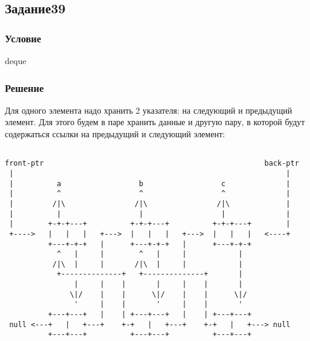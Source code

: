 \documentclass[10pt,a4paper]{article}
\begin{document}
\subsection*{Задание39}
\subsubsection*{Условие}
deque
\subsubsection*{Решение}
Для одного элемента надо хранить 2 указателя: на следующий и
предыдущий элемент. Для этого будем в паре хранить данные и другую
пару, в которой будут содержаться ссылки на предыдущий и следующий
элемент:
\begin{lstlisting}

front-ptr                                                   back-ptr
 |                                                               |
 |          a                  b                  c              |
 |          ^                  ^                  ^              |
 |         /|\                /|\                /|\             |
 |          |                  |                  |              |
 |        +-+-+---+          +-+-+---+          +-+-+---+        |
 +---->   |   |   |   +--->  |   |   |   +--->  |   |   |   <----+
          +---+-+-+   |      +---+-+-+   |      +---+-+-+
            ^   |     |        ^   |     |            |
           /|\  |     |       /|\  |     |            |
            +--------------+   +--------------+       |
                |     |    |       |     |    |       |
               \|/    |    |      \|/    |    |      \|/
                '     |    |       '     |    |       '
          +---+---+   |    | +---+---+   |    | +---+---+
 null <---+   |   +---+    +-+   |   +---+    +-+   |   +---> null
          +---+---+          +---+---+          +---+---+

\end{lstlisting}
\end{document}
